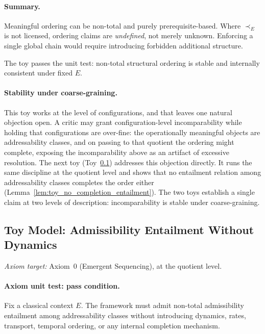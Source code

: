 \documentclass[aps,prx,onecolumn,11pt]{revtex4-2}
\theoremstyle{plain}
\theoremstyle{definition}
\theoremstyle{remark}
\begin{document}
\paragraph{Summary.}

Meaningful ordering can be non-total and purely prerequisite-based.
Where \(\prec_E\) is not licensed, ordering claims are
\emph{undefined}, not merely unknown. Enforcing a single global chain
would require introducing forbidden additional structure.

The toy passes the unit test: non-total structural ordering is stable
and internally consistent under fixed \(E\).

\paragraph{Stability under coarse-graining.}

This toy works at the level of configurations, and that leaves one
natural objection open. A critic may grant configuration-level
incomparability while holding that configurations are over-fine: the
operationally meaningful objects are addressability classes, and on
passing to that quotient the ordering might complete, exposing the
incomparability above as an artifact of excessive resolution. The next
toy (Toy~\ref{toy:admissibility_entailment}) addresses this objection
directly. It runs the same discipline at the quotient level and shows
that no entailment relation among addressability classes completes the
order either
(Lemma~\ref{lem:toy_no_completion_entailment}). The two toys establish
a single claim at two levels of description: incomparability is stable
under coarse-graining.

\subsection{Toy Model: Admissibility Entailment Without Dynamics}
\label{toy:admissibility_entailment}

\noindent\emph{Axiom target:} Axiom~0 (Emergent Sequencing), at the quotient level.

\paragraph{Axiom unit test: pass condition.}

Fix a classical context \(E\). The framework must admit non-total
admissibility entailment among addressability classes without
introducing dynamics, rates, transport, temporal ordering, or any
internal completion mechanism.
\end{document}

